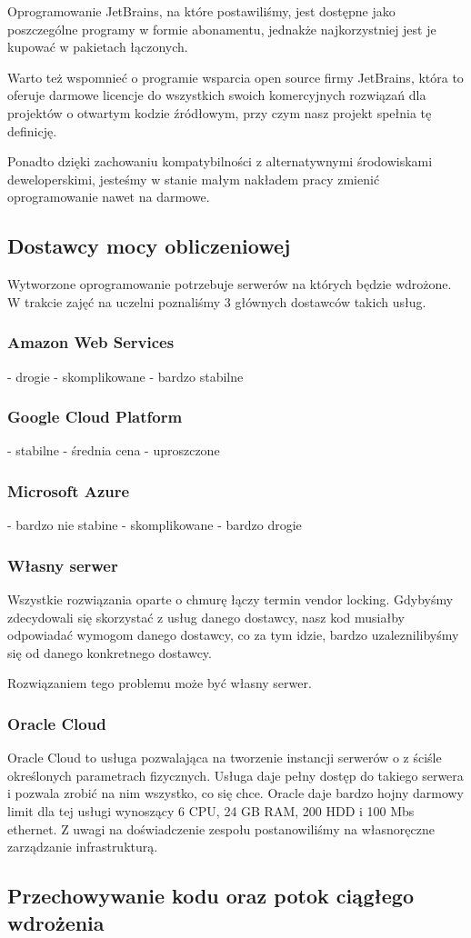Oprogramowanie JetBrains, na które postawiliśmy, jest dostępne jako poszczególne programy w formie abonamentu, jednakże najkorzystniej jest je kupować w pakietach łączonych.

Warto też wspomnieć o programie wsparcia open source firmy JetBrains, która to oferuje darmowe licencje do wszystkich swoich komercyjnych rozwiązań dla projektów o otwartym kodzie źródłowym, przy czym nasz projekt spełnia tę definicję.

Ponadto dzięki zachowaniu kompatybilności z alternatywnymi środowiskami deweloperskimi, jesteśmy w stanie małym nakładem pracy zmienić oprogramowanie nawet na darmowe.

\subsection{Dostawcy mocy obliczeniowej}
\label{subsec:dostawcy-mocy-obliczeniowej}
Wytworzone oprogramowanie potrzebuje serwerów na których będzie wdrożone.
W trakcie zajęć na uczelni poznaliśmy 3 głównych dostawców takich usług.

\subsubsection{Amazon Web Services}
- drogie
- skomplikowane
- bardzo stabilne
\subsubsection{Google Cloud Platform}
- stabilne
- średnia cena
- uproszczone
\subsubsection{Microsoft Azure}
- bardzo nie stabine
- skomplikowane
- bardzo drogie

\subsubsection{Własny serwer}
Wszystkie rozwiązania oparte o chmurę łączy termin vendor locking.
Gdybyśmy zdecydowali się skorzystać z usług danego dostawcy, nasz kod musiałby odpowiadać wymogom danego dostawcy, co za tym idzie, bardzo uzaleznilibyśmy się od danego konkretnego dostawcy.

Rozwiązaniem tego problemu może być własny serwer.
\subsubsection{Oracle Cloud}
Oracle Cloud to usługa pozwalająca na tworzenie instancji  serwerów o z ściśle określonych parametrach fizycznych.
Usługa daje pełny dostęp do takiego serwera i pozwala zrobić na nim wszystko, co się chce.
Oracle daje bardzo hojny darmowy limit dla tej usługi wynoszący 6 CPU, 24 GB RAM, 200 HDD i 100 Mbs ethernet.
Z uwagi na doświadczenie zespołu postanowiliśmy na własnoręczne zarządzanie infrastrukturą.

\subsection{Przechowywanie kodu oraz potok ciągłego wdrożenia}
\label{subsec:przechowywanie-kodu-oraz-potok-ciagego-wdrozenia}
